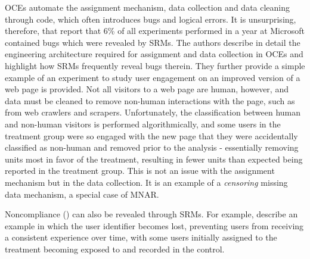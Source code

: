 \documentclass[11pt]{article}
\begin{document}
OCEs automate the assignment mechanism, data collection and data cleaning through code, which often introduces bugs and logical errors.
It is unsurprising, therefore, that \cite{fabijan} report that 6\% of all experiments performed in a year at Microsoft contained bugs which were revealed by SRMs.
The authors describe in detail the engineering architecture required for assignment and data collection in OCEs and highlight how SRMs frequently reveal bugs therein.
They further provide a simple example of an experiment to study user engagement on an improved version of a web page is provided.
Not all visitors to a web page are human, however, and data must be cleaned to remove non-human interactions with the page, such as from web crawlers and scrapers.
Unfortunately, the classification between human and non-human visitors is performed algorithmically, and some users in the treatment group were so engaged with the new page that they were accidentally classified as non-human and removed prior to the analysis - essentially removing units most in favor of the treatment, resulting in fewer units than expected being reported in the treatment group.
This is not an issue with the assignment mechanism but in the data collection.
It is an example of a \textit{censoring} missing data mechanism, a special case of MNAR.

Noncompliance (\cite{imbens}) can also be revealed through SRMs. For example, \cite{zhao} describe an example in which the user identifier becomes lost, preventing users from receiving a consistent experience over time, with some users initially assigned to the treatment becoming exposed to and recorded in the control.
\end{document}
